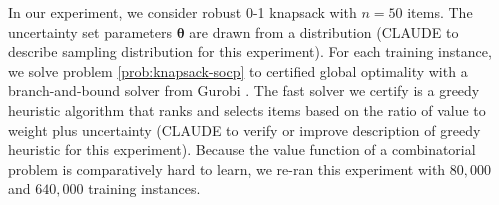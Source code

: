 \documentclass[10pt]{article} %
\theoremstyle{plain}
\theoremstyle{definition}
\theoremstyle{remark}
\begin{document}
In our experiment, we consider robust 0-1 knapsack with $n=50$ items.
The uncertainty set parameters $\mathbf{\theta}$ are drawn from a distribution (CLAUDE to describe sampling distribution for this experiment).
For each training instance, we solve problem \cref{prob:knapsack-socp}{}{} to certified global optimality with a branch-and-bound solver from Gurobi \citep{gurobi}. 
The fast solver we certify is a greedy heuristic algorithm that ranks and selects items based on the ratio of value to weight plus uncertainty (CLAUDE to verify or improve description of greedy heuristic for this experiment).
Because the value function of a combinatorial problem is comparatively hard to learn, we re-ran this experiment with $80{,}000$ and $640,000$ training instances.





\end{document}
